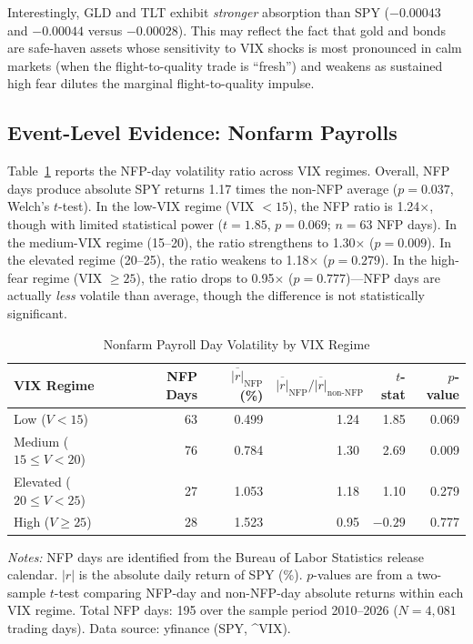 \documentclass[12pt,a4paper]{article}
\begin{document}
Interestingly, GLD and TLT exhibit \textit{stronger} absorption than SPY ($-0.00043$ and $-0.00044$ versus $-0.00028$). This may reflect the fact that gold and bonds are safe-haven assets whose sensitivity to VIX shocks is most pronounced in calm markets (when the flight-to-quality trade is ``fresh'') and weakens as sustained high fear dilutes the marginal flight-to-quality impulse.

\subsection{Event-Level Evidence: Nonfarm Payrolls}
\label{sec:nfp}

Table~\ref{tab:nfp} reports the NFP-day volatility ratio across VIX regimes. Overall, NFP days produce absolute SPY returns 1.17 times the non-NFP average ($p = 0.037$, Welch's $t$-test). In the low-VIX regime (VIX $< 15$), the NFP ratio is 1.24$\times$, though with limited statistical power ($t = 1.85$, $p = 0.069$; $n = 63$ NFP days). In the medium-VIX regime (15--20), the ratio strengthens to 1.30$\times$ ($p = 0.009$). In the elevated regime (20--25), the ratio weakens to 1.18$\times$ ($p = 0.279$). In the high-fear regime (VIX $\geq 25$), the ratio drops to 0.95$\times$ ($p = 0.777$)---NFP days are actually \textit{less} volatile than average, though the difference is not statistically significant.

\begin{table}[H]
\centering
\caption{Nonfarm Payroll Day Volatility by VIX Regime}
\label{tab:nfp}
\begin{threeparttable}
\begin{tabular}{lrrrrr}
\toprule
VIX Regime & NFP Days & $\overline{|r|}_{\text{NFP}}$ (\%) & $\overline{|r|}_{\text{NFP}} / \overline{|r|}_{\text{non-NFP}}$ & $t$-stat & $p$-value \\
\midrule
Low ($V < 15$)              & 63  & 0.499 & 1.24 & 1.85 & 0.069 \\
Medium ($15 \leq V < 20$)   & 76  & 0.784 & 1.30 & 2.69 & 0.009 \\
Elevated ($20 \leq V < 25$) & 27  & 1.053 & 1.18 & 1.10 & 0.279 \\
High ($V \geq 25$)          & 28  & 1.523 & 0.95 & $-0.29$ & 0.777 \\
\bottomrule
\end{tabular}
\begin{tablenotes}
\small
\item \textit{Notes:} NFP days are identified from the Bureau of Labor Statistics release calendar. $|r|$ is the absolute daily return of SPY (\%). $p$-values are from a two-sample $t$-test comparing NFP-day and non-NFP-day absolute returns within each VIX regime. Total NFP days: 195 over the sample period 2010--2026 ($N = 4{,}081$ trading days). Data source: yfinance (SPY, \^{}VIX).
\end{tablenotes}
\end{threeparttable}
\end{table}
\end{document}
